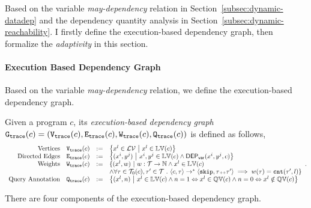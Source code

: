 
Based on the variable \emph{may-dependency} relation in Section~\ref{subsec:dynamic-datadep} and 
the dependency quantity analysis in Section~\ref{subsec:dynamic-reachability}.
I firstly define the execution-based dependency graph, then formalize the \emph{adaptivity} in this section.
\paragraph{Execution Based Dependency Graph}
\label{para:execution-base-graph-def}
Based on the variable \emph{may-dependency} relation,
we define the execution-based dependency graph.
\begin{defn}
\label{def:trace_graph}
Given a program ${c}$,
its \emph{execution-based dependency graph} 
$\mathtt{{G_{trace}}}({c}) = (\mathtt{{V_{trace}}}({c}), \mathtt{{E_{trace}}}({c}), \mathtt{{W_{trace}}}({c}), \mathtt{{Q_{trace}}}({c}))$ is defined as follows,
{
  \small
\[
\begin{array}{rlcl}
  \text{Vertices} &
  \traceV({c}) & := & \left\{ 
  x^l \in \mathcal{LV}
  ~ \middle\vert ~ x^l \in \lvar(c)
  \right\}
  \\
  \text{Directed Edges} &
  \traceE({c}) & := & 
  \left\{ 
  (x^i, y^j) 
  ~ \middle\vert ~
  x^i, y^j \in \lvar(c) \land \vardep(x^i, y^j, c) 
  \right\}
  \\
  \text{Weights} &
  \traceW({c}) & := & 
  \{ 
  (x^l, w) 
  ~ \vert ~ 
  w : \mathcal{T} \to \mathbb{N}
  \land
  x^l \in \lvar(c) 
  \\ & & &
  \land
  \forall \vtrace \in \mathcal{T}_0(c), \trace' \in \mathcal{T} \sthat \config{{c}, \trace} \to^{*} \config{\eskip, \trace\tracecat\vtrace'} 
  \implies w(\trace) = \vcounter(\vtrace', l) 
\}
  \\
  \text{Query Annotation} &
  \traceF({c}) & := & 
\left\{(x^l, n)  
~ \middle\vert ~
 x^l \in \lvar(c) \land
n = 1 \Leftrightarrow x^l \in \qvar(c) \land n = 0 \Leftrightarrow  x^l \notin \qvar(c)
\right\}
\end{array}.
\]
}
\end{defn}
%
There are four components of the execution-based dependency graph. 
